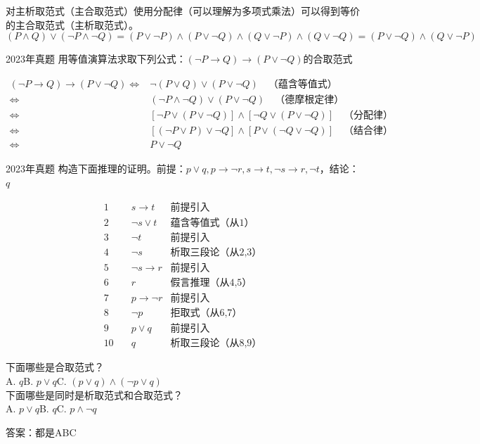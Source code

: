 对主析取范式（主合取范式）使用分配律（可以理解为多项式乘法）可以得到等价的主合取范式（主析取范式）。
\[(P \land Q) \lor (\neg P \land \neg Q) = (P\lor \neg P)\land (P\lor \neg Q)\land (Q\lor \neg P)\land (Q\lor \neg Q)= (P\lor \neg Q)\land (Q\lor \neg P) \]
\begin{example}{2023年真题}{}
    用等值演算法求取下列公式：$(\neg P\to Q)\to(P\lor\neg Q)$的合取范式
\end{example}
\vspace{-30pt}
\begin{align*}
 (\neg P \to Q) \to (P \lor \neg Q) 
\Leftrightarrow &  \neg (P \lor Q) \lor (P \lor \neg Q) \quad \text{（蕴含等值式）} \\
\Leftrightarrow & (\neg P \land \neg Q) \lor (P \lor \neg Q) \quad \text{（德摩根定律）} \\
\Leftrightarrow & [\neg P \lor (P \lor \neg Q)] \land [\neg Q \lor (P \lor \neg Q)] \quad \text{（分配律）} \\
\Leftrightarrow & [(\neg P \lor P) \lor \neg Q] \land [P \lor (\neg Q \lor \neg Q)] \quad \text{（结合律）} \\
\Leftrightarrow & P \lor \neg Q 
\end{align*}
\begin{example}{2023年真题}{}
构造下面推理的证明。前提：$p\lor q, p\to \neg r, s\to t,\neg s\to r, \neg t$，结论：$q$
\end{example}
\vspace{-30pt}
\begin{align*}
1\quad& s\to t&\text{前提引入}\\
2\quad& \neg s\lor t&\text{蕴含等值式（从1）}\\
3\quad& \neg t&\text{前提引入}\\
4\quad& \neg s&\text{析取三段论（从2,3）}\\
5\quad& \neg s\to r&\text{前提引入}\\
6\quad& r&\text{假言推理（从4,5）}\\
7\quad& p\to \neg r&\text{前提引入}\\
8\quad& \neg p&\text{拒取式（从6,7）}\\
9\quad& p\lor q&\text{前提引入}\\
10\quad& q&\text{析取三段论（从8,9）}
\end{align*}
\begin{example}{}{}
    下面哪些是合取范式？\\
    A. $q$\quad B. $p\lor q$\quad C. $(p\lor q)\land(\neg p\lor q)$\\
    下面哪些是同时是析取范式和合取范式？\\
    A. $p\lor q$\quad B. $q$\quad C. $p\land \neg q$
\end{example}
答案：都是ABC
